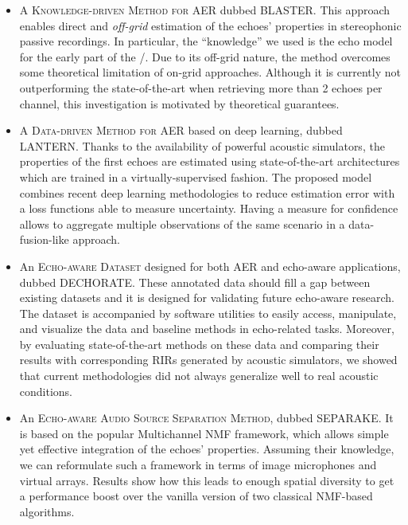 \begin{itemize}

    \item A \textsc{Knowledge-driven Method for AER} dubbed \acs{BLASTER}.
    This approach enables direct and \textit{off-grid} estimation of the echoes' properties in stereophonic passive recordings.
    In particular, the ``knowledge'' we used is the echo model for the early part of the \RIRs/.
    Due to its off-grid nature, the method overcomes some theoretical limitation of on-grid approaches.
    Although it is currently not outperforming the state-of-the-art when retrieving more than 2 echoes per channel, this investigation is motivated by theoretical guarantees.

    \item A \textsc{Data-driven Method for AER} based on deep learning, dubbed \acs{LANTERN}.
    Thanks to the availability of powerful acoustic simulators, the properties of the first echoes are estimated using state-of-the-art architectures which are trained in a virtually-supervised fashion.
    The proposed model combines recent deep learning methodologies to reduce estimation error with a loss functions able to measure uncertainty.
    Having a measure for confidence allows to aggregate multiple observations of the same scenario in a data-fusion-like approach.

    \item An \textsc{Echo-aware Dataset} designed for both AER and echo-aware applications, dubbed \acs{DECHORATE}.
    These annotated data should fill a gap between existing datasets and it is designed for validating future echo-aware research.
    The dataset is accompanied by software utilities to easily access, manipulate, and visualize the data and baseline methods in echo-related tasks.
    Moreover, by evaluating state-of-the-art methods on these data and comparing their results with corresponding \acp{RIR} generated by acoustic simulators,
    we showed that current methodologies did not always generalize well to real acoustic conditions.


    \item An \textsc{Echo-aware Audio Source Separation Method}, dubbed \acs{SEPARAKE}.
    It is based on the popular Multichannel NMF framework, which allows simple yet effective integration of the echoes' properties.
    Assuming their knowledge, we can reformulate such a framework in terms of image microphones and virtual arrays.
    Results show how this leads to enough spatial diversity to get a performance boost over the vanilla version of two classical NMF-based algorithms.


\end{itemize}
